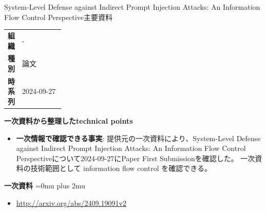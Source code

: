 \begin{technicalnote}{System-Level Defense against Indirect Prompt Injection Attacks: An Information Flow Control Perspective}{主要資料}
\begingroup
\begin{tabularx}{\linewidth}{@{}>{\bfseries}p{0.22\linewidth}X@{}}
組織 & - \\
種別 & 論文 \\
時系列 & 2024-09-27 \\
\end{tabularx}
\smallskip
{\bfseries 一次資料から整理したtechnical points}
\begin{itemize}[leftmargin=1.5em,itemsep=0.35em]
\item \textbf{一次情報で確認できる事実}: 提供元の一次資料により、System-Level Defense against Indirect Prompt Injection Attacks: An Information Flow Control Perspectiveについて2024-09-27にPaper First Submissionを確認した。 一次資料の技術範囲として information flow control を確認できる。
\end{itemize}
\begin{minipage}{\linewidth}
\begin{samepage}
{\bfseries 一次資料}
\begingroup\sloppy
\Urlmuskip=0mu plus 2mu\relax
\begin{itemize}[leftmargin=1.5em,itemsep=0.25em]
\item {\scriptsize\url{http://arxiv.org/abs/2409.19091v2}}
\end{itemize}
\endgroup
\end{samepage}
\end{minipage}
\endgroup
\end{technicalnote}
\medskip


